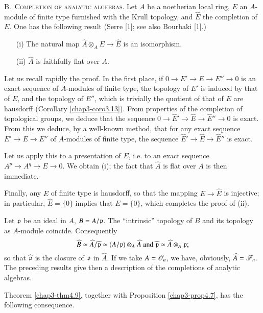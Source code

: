 \noindent
B.~\textsc{Completion of analytic algebras.} Let $A$ be a noetherian local ring, $E$ an $A$-module of finite type furnished with the Krull topology, and $\widehat{E}$ the completion of $E$. One has the following result (Serre [1]; see also Bourbaki [1].)

\begin{theorem}\label{chap3-thm4.9}
\begin{itemize}
\item[\rm(i)] The natural map $\widehat{A}\otimes_{A}E\to \widehat{E}$ is an isomorphism.

\item[\rm(ii)] $\widehat{A}$ is faithfully flat over $A$.
\end{itemize}
\end{theorem}

Let us recall rapidly the proof. In the first place, if $0\to E'\to E\to E''\to 0$ is an exact sequence of $A$-modules of finite type, the topology of $E'$ is induced by that of $E$, and the topology of $E''$, which is trivially the quotient of that of $E$ are hausdorff (Corollary \ref{chap3-coro3.13}). From properties of the completion of topological groups, we deduce that the sequence $0\to \widehat{E}'\to \widehat{E}\to \widehat{E}''\to 0$ is exact. From this we deduce, by a well-known method, that for any exact sequence $E'\to E\to E''$ of $A$-modules of finite type, the sequence $\widehat{E}'\to \widehat{E}\to \widehat{E}''$ is exact.

Let us apply this to a presentation of $E$, i.e. to an exact sequence $A^{p}\to A^{q}\to E\to 0$. We obtain (i); the fact that $\widehat{A}$ is flat over $A$ is then immediate.

Finally, any $E$ of finite type is hausdorff, so that the mapping $E\to \widehat{E}$ is injective; in particular, $\widehat{E}=\{0\}$ implies that $E=\{0\}$, which completes the proof of (ii).

Let $\mathfrak{p}$ be an ideal in $A$, $B=A/\mathfrak{p}$. The ``intrinsic'' topology of $B$ and its topology as $A$-module coincide. Consequently 
$$
\widehat{B}\simeq \widehat{A}/\widehat{\mathfrak{p}}\simeq (A/\mathfrak{p})\otimes_{A}\widehat{A}\text{ and } \widehat{\mathfrak{p}}\simeq \widehat{A}\otimes_{A}\mathfrak{p};
$$
so that $\widehat{\mathfrak{p}}$ is the closure of $\mathfrak{p}$ in $\widehat{A}$. If we take $A=\mathscr{O}_{n}$, we have, obviously, $\widehat{A}=\mathscr{F}_{n}$. The preceding results give then a description of the completions of analytic algebras.

Theorem \ref{chap3-thm4.9}, together with Proposition \ref{chap3-prop4.7}, has the following consequence.

